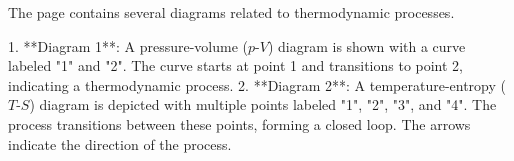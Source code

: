 The page contains several diagrams related to thermodynamic processes.  

1. **Diagram 1**: A pressure-volume (\(p\)-\(V\)) diagram is shown with a curve labeled "1" and "2". The curve starts at point 1 and transitions to point 2, indicating a thermodynamic process.  
2. **Diagram 2**: A temperature-entropy (\(T\)-\(S\)) diagram is depicted with multiple points labeled "1", "2", "3", and "4". The process transitions between these points, forming a closed loop. The arrows indicate the direction of the process.